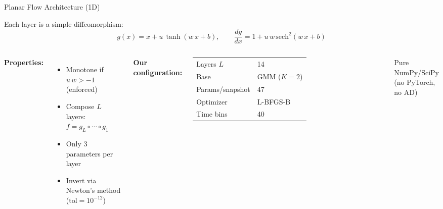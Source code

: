 \documentclass[aspectratio=169,11pt]{beamer}
\begin{document}

\begin{frame}{Planar Flow Architecture (1D)}

Each layer is a simple diffeomorphism:
\begin{equation*}
    g(x) = x + u\,\tanh(w\,x + b), \qquad
    \frac{dg}{dx} = 1 + u\,w\,\mathrm{sech}^2(w\,x + b)
\end{equation*}

\begin{columns}[T]
\textbf{Properties:}
\begin{itemize}
    \item Monotone if $u\,w > -1$ (enforced)
    \item Compose $L$ layers: $f = g_L \circ \cdots \circ g_1$
    \item Only 3 parameters per layer
    \item Invert via Newton's method ($\mathrm{tol}=10^{-12}$)
\end{itemize}

\centering
\textbf{Our configuration:}\\[0.3em]
\begin{tabular}{ll}
\toprule
Layers $L$ & 14 \\
Base & GMM ($K=2$) \\
Params/snapshot & 47 \\
Optimizer & L-BFGS-B \\
Time bins & 40 \\
\bottomrule
\end{tabular}

\smallskip
{\small Pure NumPy/SciPy\\(no PyTorch, no AD)}
\end{columns}

\end{frame}

\end{document}

